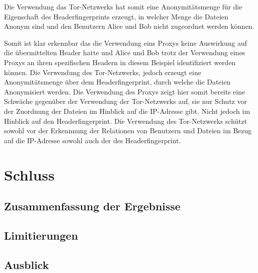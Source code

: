 \documentclass[
    fontsize=12pt,
    headings=small,
    parskip=half,           %
    bibliography=totoc,
    numbers=noenddot,       %
    open=any,               %
    ]{scrreprt}
\begin{document}
Die Verwendung das Tor-Netzwerks hat somit eine Anonymitätsmenge für die Eigenschaft des Headerfingerprints erzeugt, in welcher Menge die Dateien Anonym sind und den Benutzern Alice und Bob nicht zugeordnet werden können.

Somit ist klar erkennbar das die Verwendung eins Proxys keine Auswirkung auf die übermittelten Header hatte und Alice und Bob trotz der Verwendung eines Proxys an ihren spezifischen Headern in diesem Beispiel identifiziert werden können.
Die Verwendung des Tor-Netzwerks, jedoch erzeugt eine Anonymitätsmenge über dem Headerfingerprint, durch welche die Dateien Anonymisiert werden.
Die Verwendung des Proxys zeigt hier somit bereits eine Schwäche gegenüber der Verwendung der Tor-Netzwerks auf, sie nur Schutz vor der Zuordnung der Dateien im Hinblick auf die IP-Adresse gibt.
Nicht jedoch im Hinblick auf den Headerfingerprint.
Die Verwendung des Tor-Netzwerks schützt sowohl vor der Erkennnung der Relationen von Benutzern und Dateien im Bezug auf die IP-Adresse sowohl auch der des Headerfingerprint.




\chapter{Schluss}
\section{Zusammenfassung der Ergebnisse}
\section{Limitierungen}
\section{Ausblick}
\end{document}
